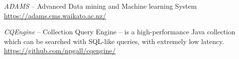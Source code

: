 %

\begin{thebibliography}{999}

		\textit{ADAMS} -- Advanced Data mining and Machine learning System \\
		\url{https://adams.cms.waikato.ac.nz/}{}
		
                \textit{CQEngine} -- Collection Query Engine – is a high-performance 
                Java collection which can be searched with SQL-like queries, with 
                extremely low latency. \\
		\url{https://github.com/npgall/cqengine/}{}

\end{thebibliography}
